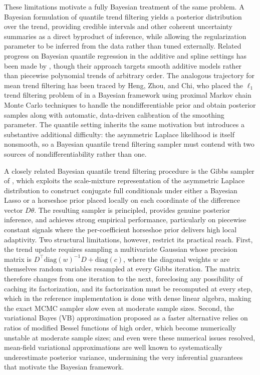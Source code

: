 These limitations motivate a fully Bayesian treatment of the same problem. A Bayesian formulation of quantile trend filtering yields a posterior distribution over the trend, providing credible intervals and other coherent uncertainty summaries as a direct byproduct of inference, while allowing the regularization parameter to be inferred from the data rather than tuned externally. Related progress on Bayesian quantile regression in the additive and spline settings has been made by \citet{fasiolo2021fast}, though their approach targets smooth additive models rather than piecewise polynomial trends of arbitrary order. The analogous trajectory for mean trend filtering has been traced by Heng, Zhou, and Chi, who placed the $\ell_1$ trend filtering problem of \citet{tibshirani2014adaptive} in a Bayesian framework using proximal Markov chain Monte Carlo techniques \citep{pereyra2016proximal} to handle the nondifferentiable prior and obtain posterior samples along with automatic, data-driven calibration of the smoothing parameter. The quantile setting inherits the same motivation but introduces a substantive additional difficulty: the asymmetric Laplace likelihood is itself nonsmooth, so a Bayesian quantile trend filtering sampler must contend with two sources of nondifferentiability rather than one.

A closely related Bayesian quantile trend filtering procedure is the Gibbs sampler of \citet{onizuka2024fast}, which exploits the scale-mixture representation of the asymmetric Laplace distribution to construct conjugate full conditionals under either a Bayesian Lasso or a horseshoe prior placed locally on each coordinate of the difference vector $D\theta$. The resulting sampler is principled, provides genuine posterior inference, and achieves strong empirical performance, particularly on piecewise constant signals where the per-coefficient horseshoe prior delivers high local adaptivity. Two structural limitations, however, restrict its practical reach. First, the trend update requires sampling a multivariate Gaussian whose precision matrix is $D^\top \mathrm{diag}(w)^{-1} D + \mathrm{diag}(c)$, where the diagonal weights $w$ are themselves random variables resampled at every Gibbs iteration. The matrix therefore changes from one iteration to the next, foreclosing any possibility of caching its factorization, and its factorization must be recomputed at every step, which in the reference implementation is done with dense linear algebra, making the exact MCMC sampler slow even at moderate sample sizes. Second, the variational Bayes (VB) approximation proposed as a faster alternative relies on ratios of modified Bessel functions of high order, which become numerically unstable at moderate sample sizes; and even were these numerical issues resolved, mean-field variational approximations are well known to systematically underestimate posterior variance, undermining the very inferential guarantees that motivate the Bayesian framework.

